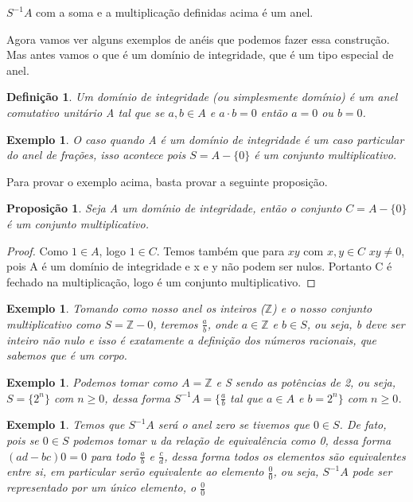\documentclass[10pt,a4paper]{article}
\newtheorem{proposition}[theorem]{Proposição}
\newtheorem{example}[theorem]{Exemplo}
\newtheorem{definition}[theorem]{Definição}
\begin{document}
$S^{-1}A$ com a soma e a multiplicação definidas acima é um anel.

Agora vamos ver alguns exemplos de anéis que podemos fazer essa construção. Mas antes vamos o que é um domínio de integridade, que é um tipo especial de anel.

\begin{definition}
	Um domínio de integridade (ou simplesmente domínio) é um anel comutativo unitário A tal que se $a, b \in A$ e $a\cdot b=0$ então $a=0$ ou $b=0$.
\end{definition}

\begin{example}
	O caso quando A é um domínio de integridade é um caso particular do anel de frações, isso acontece pois $S=A-\{0\}$ é um conjunto multiplicativo. 
\end{example}

Para provar o exemplo acima, basta provar a seguinte proposição.

\begin{proposition}
	Seja A um domínio de integridade, então o conjunto $C = A - \{0\}$ é um conjunto multiplicativo.
\end{proposition}

\begin{proof}
	Como $1 \in A$, logo $1 \in C$. Temos também que para $xy$ com $x,y \in C$ $xy \neq 0$, pois A é um domínio de integridade e x e y não podem ser nulos. Portanto C é fechado na multiplicação, logo é um conjunto multiplicativo.
\end{proof}

\begin{example}
	Tomando como nosso anel os inteiros ($\mathbb{Z}$) e o nosso conjunto multiplicativo como $S=\mathbb{Z} - {0}$, teremos $\frac{a}{b}$, onde  $a \in \mathbb{Z}$ e $b \in S$, ou seja, b deve ser inteiro não nulo e isso é exatamente a definição dos números racionais, que sabemos que é um corpo.
\end{example}

\begin{example}
	Podemos tomar como $A=\mathbb{Z}$ e S sendo as potências de 2, ou seja, $S=\{2^n\}$ com $n \geq 0$, dessa forma $S^{-1}A=\{\frac{a}{b}$ tal que $ a \in A$ e $b=2^n \}$ com $n \geq 0$.
\end{example}

\begin{example}
	Temos que $S^{-1}A$ será o anel zero se tivemos que $0 \in S$. De fato, pois se $0 \in S$ podemos tomar u da relação de equivalência como 0, dessa forma $(ad-bc)0=0$ para todo $\frac{a}{b}$ e $\frac{c}{d}$, dessa forma todos os elementos são equivalentes entre si, em particular serão equivalente ao elemento $\frac{0}{0}$, ou seja, $S^{-1}A$ pode ser representado por um único elemento, o $\frac{0}{0}$
\end{example}
\end{document}
